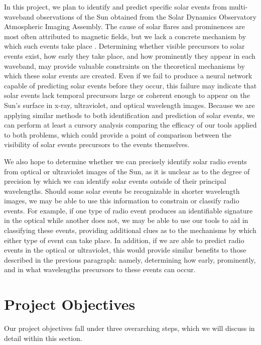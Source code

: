 \documentclass[12pt, letterpaper]{article}
\begin{document}
In this project, we plan to identify and predict specific solar events from multi-waveband observations of the Sun obtained from the Solar Dynamics Observatory Atmospheric Imaging Assembly. The cause of solar flares and prominences are most often attributed to magnetic fields, but we lack a concrete mechanism by which such events take place \cite{BOB}. Determining whether visible precursors to solar events exist, how early they take place, and how prominently they appear in each waveband, may provide valuable constraints on the theoretical mechanisms by which these solar events are created. Even if we fail to produce a neural network capable of predicting solar events before they occur, this failure may indicate that solar events lack temporal precursors large or coherent enough to appear on the Sun’s surface in x-ray, ultraviolet, and optical wavelength images. Because we are applying similar methods to both identification and prediction of solar events, we can perform at least a cursory analysis comparing the efficacy of our tools applied to both problems, which could provide a point of comparison between the visibility of solar events precursors to the events themselves. 

We also hope to determine whether we can precisely identify solar radio events from optical or ultraviolet images of the Sun, as it is unclear as to the degree of precision by which we can identify solar events outside of their principal wavelengths. Should some solar events be recognizable in shorter wavelength images, we may be able to use this information to constrain or classify radio events. For example, if one type of radio event produces an identifiable signature in the optical while another does not, we may be able to use our tools to aid in classifying these events, providing additional clues as to the mechanisms by which either type of event can take place. In addition, if we are able to predict radio events in the optical or ultraviolet, this would provide similar benefits to those described in the previous paragraph: namely, determining how early, prominently, and in what wavelengths precursors to these events can occur. 

\section*{Project Objectives}

Our project objectives fall under three overarching steps, which we will discuss in detail within this section. 
\end{document}
